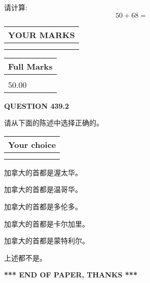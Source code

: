 \documentclass{ctexart}
\begin{document}
  
 
请计算:
\begin{equation}
50 +  %
68 = \nonumber
\end{equation}
 

 

 
  
\vspace{0.2in}
  
\noindent\begin{tabular}{|l|}
\hline
 YOUR MARKS  \\
\hline
 \\ 
 \\ 
\hline
\end{tabular}
\hspace{0.05in} \begin{tabular}{|l|}
\hline
 Full Marks  \\
\hline
 \\ 
50.00 \\
\hline
\end{tabular}
{\textbf{\Large{QUESTION
439.2 
}}}
  
  
请从下面的陈述中选择正确的。
  
  
\noindent\hspace{3.0in} \begin{tabular}{|l|}
\hline
Your choice \\
\hline
 \\ 
 \\ 
\hline
\end{tabular}
  
  
 
 
加拿大的首都是渥太华。
 
 
加拿大的首都是温哥华。
 
 
加拿大的首都是多伦多。
 
 
加拿大的首都是卡尔加里。
 
 
加拿大的首都是蒙特利尔。
 
 
 上述都不是。
 
 
   
   
 \vspace{0.2in}
 
   
   
   
   
\vspace{1.0in} 
{\textbf{\large{ *** END OF PAPER, THANKS *** }}} 
   
\end{document}
